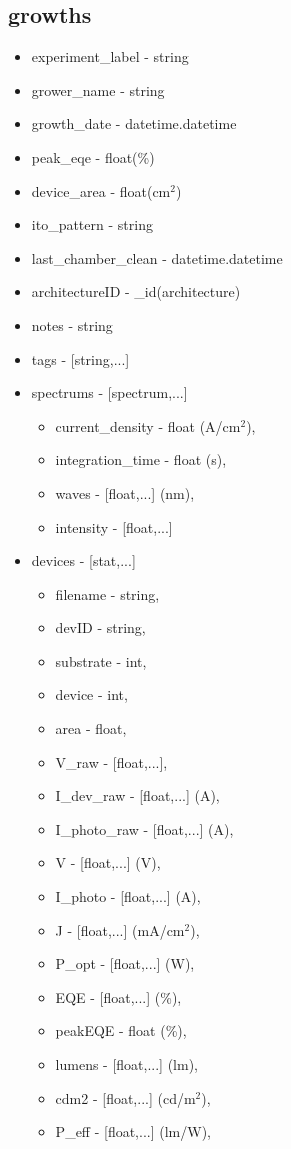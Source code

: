 \documentclass[../thesis.tex]{subfiles}
\begin{document}
\subsection{growths}

\begin{itemize}
\item experiment\_label - string
\item grower\_name - string
\item growth\_date - datetime.datetime
\item peak\_eqe - float(\%)
\item device\_area - float(cm$^2$)
\item ito\_pattern - string
\item last\_chamber\_clean - datetime.datetime
\item architectureID - \_id(architecture)
\item notes - string
\item tags - [string,...]
\item spectrums - [spectrum,...]

\begin{itemize}
\item current\_density - float (A/cm$^2$),
\item integration\_time - float (s),
\item waves - [float,...] (nm),
\item intensity - [float,...]
\end{itemize}

\item devices - [stat,...]

\begin{itemize}
\item filename - string,
\item devID - string,
\item substrate - int,
\item device - int,
\item area - float,
\item V\_raw - [float,...],
\item I\_dev\_raw - [float,...] (A),
\item I\_photo\_raw - [float,...] (A),
\item V - [float,...] (V),
\item I\_photo - [float,...] (A),
\item J - [float,...] (mA/cm$^2$),
\item P\_opt - [float,...] (W),
\item EQE - [float,...] (\%),
\item peakEQE - float (\%),
\item lumens - [float,...] (lm),
\item cdm2 - [float,...] (cd/m$^2$),
\item P\_eff - [float,...] (lm/W),
\end{itemize}
\end{itemize}
\end{document}
